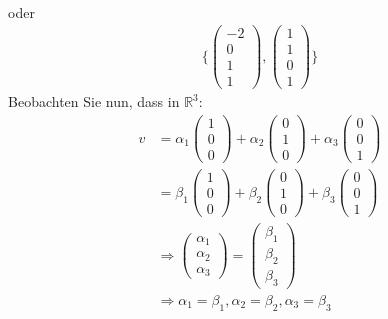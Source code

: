 \documentclass[11pt]{report}
\newcommand*\Zb[1] {\mathbb{#1}}
\begin{document}
\begin{itemize}
\begin{align}
\end{align}
oder 
\begin{align}
 \{\begin{pmatrix} -2 \\ 0 \\ 1 \\ 1 \end{pmatrix}, \begin{pmatrix} 1 \\ 1 \\ 0 \\ 1 \end{pmatrix}\} 
\end{align}
Beobachten Sie nun, dass in $\Zb{R}^3$:
\begin{align}
 v &= \alpha_1 \begin{pmatrix} 1\\0\\0 \end{pmatrix} + \alpha_2 \begin{pmatrix} 0\\1\\0 \end{pmatrix} + \alpha_3 \begin{pmatrix} 0\\0\\1 \end{pmatrix} \\
 &= \beta_1 \begin{pmatrix} 1\\0\\0 \end{pmatrix} + \beta_2 \begin{pmatrix} 0\\1\\0 \end{pmatrix} + \beta_3 \begin{pmatrix} 0\\0\\1 \end{pmatrix} \\
 &\Rightarrow \begin{pmatrix} \alpha_1 \\ \alpha_2 \\ \alpha_3 \end{pmatrix} = \begin{pmatrix} \beta_1 \\ \beta_2 \\ \beta_3 \end{pmatrix} \\
&\Rightarrow  \alpha_1 = \beta_1, \alpha_2 = \beta_2, \alpha_3 = \beta_3 
\end{align}
\end{itemize}
\end{document}
